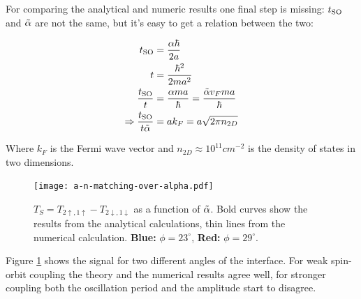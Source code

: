 For comparing the analytical and numeric results one final step is missing:
$t_{\textnormal{SO}}$ and $\tilde \alpha$ are not the same, but it's easy to get a relation between the
two:

\begin{align}
    t_{\textnormal{SO}} &= \frac{\alpha\hbar}{2a}\\
    t    &= \frac{\hbar^2}{2 m a^2}\\
    \frac{t_{\textnormal{SO}}}{t} &= \frac{\alpha m a}{\hbar} = \frac{\tilde \alpha v_F m a}{\hbar} \\
    \Rightarrow \frac{t_{\textnormal{SO}}}{t \tilde \alpha} &= a k_F = a \sqrt{2 \pi n_{2D}}
\end{align}

Where $k_F$ is the Fermi wave vector and $n_{2D} \approx 10^{11} cm^{-2}$ is
the density of states in two dimensions.

\begin{figure}
    \begin{center}
        \texttt{[image: a-n-matching-over-alpha.pdf]}
    \end{center}
    \caption{$T_S = T_{2\uparrow,1\uparrow} - T_{2\downarrow,1\downarrow}$ as
        a function of $\tilde \alpha$. Bold curves show the results from the analytical
        calculations, thin lines from the numerical calculation.
        \textbf{Blue:} $\phi = 23^\circ$, \textbf{Red:} $\phi = 29^\circ$.
    }
    \label{fig:a-n-matching-alpha}
\end{figure}

Figure \ref{fig:a-n-matching-alpha} shows the signal for two different
angles of the interface. For weak spin-orbit coupling the theory and the
numerical results agree well, for stronger coupling both the oscillation
period and the amplitude start to disagree.


